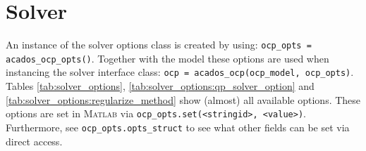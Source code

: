 \documentclass[english]{article}
\newcommand{\code}[1]{\texttt{#1}}
\newcommand{\matlab}{\textsc{Matlab}}
\begin{document}
\section{Solver}\label{sec:solver}
%
An instance of the solver options class is created by using: \code{ocp\_opts = acados\_ocp\_opts()}.
Together with the model these options are used when instancing the solver interface class: \code{ocp = acados\_ocp(ocp\_model, ocp\_opts)}.
Tables \ref{tab:solver_options}, \ref{tab:solver_options:qp_solver_option} and \ref{tab:solver_options:regularize_method} show (almost) all available options. These options are set in \matlab{} via \code{ocp\_opts.set(<stringid>, <value>)}.
Furthermore, see \code{ocp\_opts.opts\_struct} to see what other fields can be set via direct access.
\end{document}
